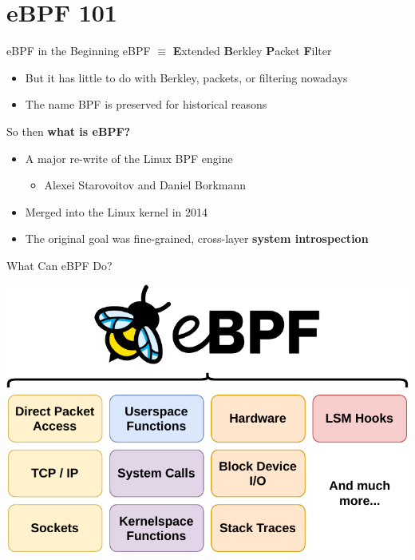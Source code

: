 \documentclass[12pt, dvipsnames, aspectratio=169]{beamer}
\begin{document}
\section{eBPF 101}

\begin{frame}[c]{eBPF in the Beginning}
eBPF $\equiv$ \textbf{E}xtended \textbf{B}erkley \textbf{P}acket \textbf{F}ilter
\begin{itemize}
    \item But it has little to do with Berkley, packets, or filtering nowadays
    \item The name BPF is preserved for historical reasons
\end{itemize}
\vfill
So then \textbf{what is eBPF?}
\begin{itemize}
    \item A major re-write of the Linux BPF engine
    \begin{itemize}
        \item Alexei Starovoitov and Daniel Borkmann
    \end{itemize}
    \item Merged into the Linux kernel in 2014
    \item The original goal was fine-grained, cross-layer \textbf{system introspection}
\end{itemize}
\end{frame}

\begin{frame}[c]{What Can eBPF Do?}
\begin{center}
    \color{black}
    \includegraphics[height=0.8\textheight]{figs/ebpf-overview.pdf}
\end{center}
\end{frame}
\end{document}
